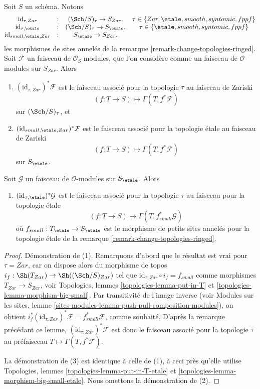 \begin{lemma}
\label{lemma-compare-sites}
Soit $S$ un schéma. Notons
$$
\begin{matrix}
\text{id}_{\tau, Zar} & : & (\Sch/S)_\tau \to S_{Zar}, &
\tau \in \{Zar, \etale, smooth, syntomic, fppf\} \\
\text{id}_{\tau, \etale} & : &
(\Sch/S)_\tau \to S_\etale, &
\tau \in \{\etale, smooth, syntomic, fppf\} \\
\text{id}_{small, \etale, Zar} & : & S_\etale \to S_{Zar},
\end{matrix}
$$
les morphismes de sites annelés de la
remarque \ref{remark-change-topologies-ringed}.
Soit $\mathcal{F}$ un faisceau de $\mathcal{O}_S$-modules,
que l'on considère comme un faisceau de $\mathcal{O}$-modules sur $S_{Zar}$. Alors
\begin{enumerate}
\item $(\text{id}_{\tau, Zar})^*\mathcal{F}$ est le faisceau associé pour la topologie $\tau$
au faisceau de Zariski
$$
(f : T \to S) \longmapsto \Gamma(T, f^*\mathcal{F})
$$
sur $(\Sch/S)_\tau$, et
\item $(\text{id}_{small, \etale, Zar})^*\mathcal{F}$ est le
faisceau associé pour la topologie \'etale au faisceau de Zariski
$$
(f : T \to S) \longmapsto \Gamma(T, f^*\mathcal{F})
$$
sur $S_\etale$.
\end{enumerate}
Soit $\mathcal{G}$ un faisceau de $\mathcal{O}$-modules
sur $S_\etale$. Alors
\begin{enumerate}
\item[(3)] $(\text{id}_{\tau, \etale})^*\mathcal{G}$ est le
faisceau associé pour la topologie $\tau$ au faisceau pour la topologie \'etale
$$
(f : T \to S) \longmapsto \Gamma(T, f_{small}^*\mathcal{G})
$$
où $f_{small} : T_\etale \to S_\etale$
est le morphisme de petits sites annelés pour la topologie \'etale de la
remarque \ref{remark-change-topologies-ringed}.
\end{enumerate}
\end{lemma}

\begin{proof}
Démonstration de (1). Remarquons d'abord que le résultat est vrai pour $\tau = Zar$,
car on dispose alors du morphisme de topos
$i_f : \Sh(T_{Zar}) \to \Sh((\Sch/S)_{Zar})$
tel que $\text{id}_{\tau, Zar} \circ i_f = f_{small}$ comme morphismes
$T_{Zar} \to S_{Zar}$, voir
Topologies, lemmes \ref{topologies-lemma-put-in-T} et
\ref{topologies-lemma-morphism-big-small}.
Par transitivité de l'image inverse (voir
Modules sur les sites,
lemme \ref{sites-modules-lemma-push-pull-composition-modules}),
on obtient
$i_f^*(\text{id}_{\tau, Zar})^*\mathcal{F} = f_{small}^*\mathcal{F}$,
comme souhaité. D'après la remarque précédant ce lemme,
$(\text{id}_{\tau, Zar})^*\mathcal{F}$ est donc le faisceau associé pour la topologie $\tau$
au préfaisceau $T \mapsto \Gamma(T, f^*\mathcal{F})$.

\medskip\noindent
La démonstration de (3) est identique à celle de (1), à ceci près qu'elle
utilise
Topologies, lemmes \ref{topologies-lemma-put-in-T-etale} et
\ref{topologies-lemma-morphism-big-small-etale}.
Nous omettons la démonstration de (2).
\end{proof}

